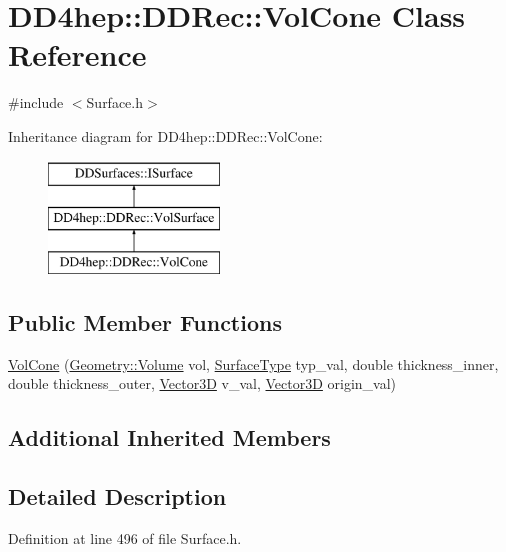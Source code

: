 \hypertarget{class_d_d4hep_1_1_d_d_rec_1_1_vol_cone}{}\section{D\+D4hep\+:\+:D\+D\+Rec\+:\+:Vol\+Cone Class Reference}
\label{class_d_d4hep_1_1_d_d_rec_1_1_vol_cone}


{\ttfamily \#include $<$Surface.\+h$>$}

Inheritance diagram for D\+D4hep\+:\+:D\+D\+Rec\+:\+:Vol\+Cone\+:\begin{figure}[H]
\begin{center}
\leavevmode
\includegraphics[height=3.000000cm]{class_d_d4hep_1_1_d_d_rec_1_1_vol_cone}
\end{center}
\end{figure}
\subsection*{Public Member Functions}
\begin{DoxyCompactItemize}
\item 
\hyperlink{class_d_d4hep_1_1_d_d_rec_1_1_vol_cone_a99d5b9981b298e9bbde8929511e157d1}{Vol\+Cone} (\hyperlink{class_d_d4hep_1_1_geometry_1_1_volume}{Geometry\+::\+Volume} vol, \hyperlink{class_d_d_surfaces_1_1_surface_type}{Surface\+Type} typ\+\_\+val, double thickness\+\_\+inner, double thickness\+\_\+outer, \hyperlink{class_d_d_surfaces_1_1_vector3_d}{Vector3D} v\+\_\+val, \hyperlink{class_d_d_surfaces_1_1_vector3_d}{Vector3D} origin\+\_\+val)
\end{DoxyCompactItemize}
\subsection*{Additional Inherited Members}


\subsection{Detailed Description}


Definition at line 496 of file Surface.\+h.



